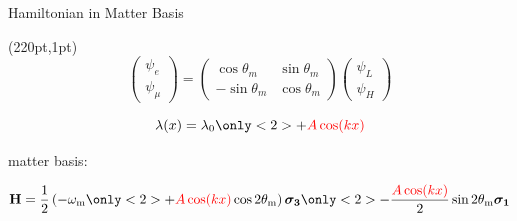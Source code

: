 \begin{frame}{Hamiltonian in Matter Basis}

\begin{textblock*}{10pt}(220pt,1pt)
\small
\begin{equation*}
\begin{pmatrix}
\psi_e\\
\psi_\mu
\end{pmatrix} = \begin{pmatrix}
\cos \theta_m & \sin\theta_m \\
-\sin \theta_m & \cos \theta_m
\end{pmatrix}\begin{pmatrix}
\psi_L\\
\psi_H
\end{pmatrix}
\end{equation*}

\end{textblock*}


\begin{tcolorbox}[title=Matter Potential]
\begin{equation*}
    \lambda(x)  = \lambda_0 \only<2>{ + {\color{red}A\cos(k x)} }
\end{equation*}
\end{tcolorbox}




\begin{tcolorbox}[title=Hamiltonian]

 matter basis:


\begin{equation*}
    \mathbf H = \frac{1}{2}\left( - \omega_{\mathrm{m}}
    \only<2>{
    + {\color{red}A\cos(kx)} \cos 2\theta_{\mathrm{m}}
    }
    \right) \boldsymbol{\sigma_3}
    \only<2>{
    - \frac{{\color{red}A\cos(kx) } }{2} \sin 2\theta_{\mathrm{m}} \boldsymbol{\sigma_1}
    }
\end{equation*}


\end{tcolorbox}






\end{frame}






